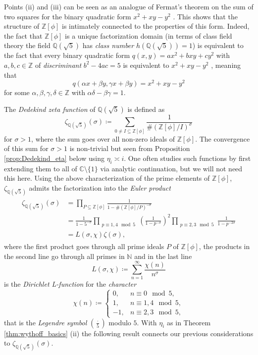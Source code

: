 \documentclass[]{interact}
\newcommand{\bbC}{\mathbb{C}}
\newcommand{\bbN}{\mathbb{N}}
\newcommand{\bbQ}{\mathbb{Q}}
\newcommand{\bbZ}{\mathbb{Z}}
\newcommand{\sm}{\setminus}
\newcommand{\sbse}{\subseteq}
\theoremstyle{definition}
\numberwithin{table}{section} %
\numberwithin{figure}{section}
\begin{document}
Points (ii) and (iii) can be seen as an analogue of Fermat's theorem on the sum of two squares for the binary quadratic form $x^2+xy-y^2$ \cite{Bue89, Coh93, Cox89}. This shows that the structure of $\bbZ[\phi]$ is intimately connected to the properties of this form. Indeed, the fact that $\bbZ[\phi]$ is a unique factorization domain (in terms of class field theory the field $\bbQ(\sqrt5)$ has \emph{class number} $h(\bbQ(\sqrt5))=1$) is equivalent to the fact that every binary quadratic form $q(x, y) = ax^2+bxy+cy^2$ with $a, b, c \in \bbZ$ of \emph{discriminant} $b^2-4ac = 5$ is equivalent to $x^2+xy-y^2$ \cite{Coh93}, meaning that
$$
q(\alpha x + \beta y, \gamma x+\beta y) = x^2+xy-y^2
$$
for some $\alpha, \beta, \gamma, \delta \in \bbZ$ with $ \alpha\delta-\beta\gamma=1$.

The \emph{Dedekind zeta function} of $\bbQ(\sqrt5)$ is defined as
$$
\zeta_{\bbQ(\sqrt5)}(\sigma) \coloneqq \sum_{0 \neq I \sbse \bbZ[\phi]} \frac1{\#(\bbZ[\phi] / I)^\sigma}
$$
for $\sigma > 1$, where the sum goes over all non-zero ideals of $\bbZ[\phi]$. The convergence of this sum for $\sigma > 1$ is non-trivial but seen from Proposition \ref{prop:Dedekind_eta} below using $\eta_i \asymp i$. One often studies such functions by first extending them to all of $\bbC \sm \{1\}$ via analytic continuation, but we will not need this here. Using the above characterization of the prime elements of $\bbZ[\phi]$, $\zeta_{\bbQ(\sqrt5)}$ admits the factorization into the \emph{Euler product}
\begin{align} \label{eq:zeta_factorization}
    \begin{split}
        \zeta_{\bbQ(\sqrt5)}(\sigma) & = \prod_{P \sbse \bbZ[\phi]} \frac1{1-\#(\bbZ[\phi] / P)^{-\sigma}} \\
        & = \frac1{1-5^{-\sigma}} \prod_{\substack{p \equiv 1, 4 \mod 5}} \left(\frac1{1-p^{-\sigma}}\right)^2 \prod_{\substack{p \equiv 2, 3 \mod 5}} \frac1{1-p^{-2\sigma}} \\
        & = L(\sigma, \chi) \zeta(\sigma),
    \end{split}
\end{align}
where the first product goes through all prime ideals $P$ of $\bbZ[\phi]$, the products in the second line go through all primes in $\bbN$ and in the last line
$$
L(\sigma, \chi) \coloneqq \sum_{n=1}^\infty \frac{\chi(n)}{n^\sigma}
$$
is the \emph{Dirichlet L-function} for the \emph{character} 
$$
\chi(n) \coloneqq \begin{cases}
    0, & n \equiv 0 \mod 5, \\
    1, & n \equiv 1, 4 \mod 5, \\
    -1, & n \equiv 2, 3 \mod 5,
\end{cases}
$$
that is the \emph{Legendre symbol} $(\frac\cdot5)$ modulo $5$. With $\eta_i$ as in Theorem \ref{thm:wythoff_basics} (ii) the following result connects our previous considerations to $\zeta_{\bbQ(\sqrt5)}(\sigma)$.
\end{document}
